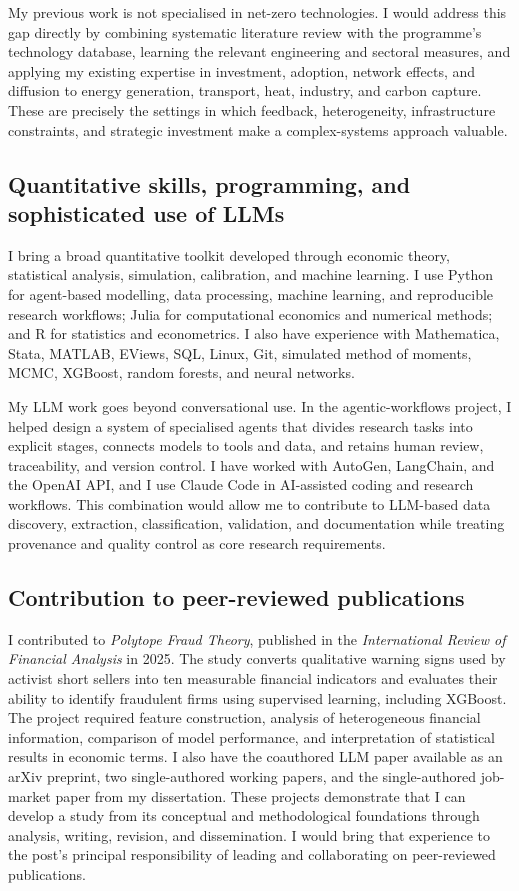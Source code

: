 \documentclass{nfr}
\begin{document}
My previous work is not specialised in net-zero technologies. I would address this gap directly by combining systematic literature review with the programme's technology database, learning the relevant engineering and sectoral measures, and applying my existing expertise in investment, adoption, network effects, and diffusion to energy generation, transport, heat, industry, and carbon capture. These are precisely the settings in which feedback, heterogeneity, infrastructure constraints, and strategic investment make a complex-systems approach valuable.

\subsection*{Quantitative skills, programming, and sophisticated use of LLMs}

I bring a broad quantitative toolkit developed through economic theory, statistical analysis, simulation, calibration, and machine learning. I use Python for agent-based modelling, data processing, machine learning, and reproducible research workflows; Julia for computational economics and numerical methods; and R for statistics and econometrics. I also have experience with Mathematica, Stata, MATLAB, EViews, SQL, Linux, Git, simulated method of moments, MCMC, XGBoost, random forests, and neural networks.

My LLM work goes beyond conversational use. In the agentic-workflows project, I helped design a system of specialised agents that divides research tasks into explicit stages, connects models to tools and data, and retains human review, traceability, and version control. I have worked with AutoGen, LangChain, and the OpenAI API, and I use Claude Code in AI-assisted coding and research workflows. This combination would allow me to contribute to LLM-based data discovery, extraction, classification, validation, and documentation while treating provenance and quality control as core research requirements.

\subsection*{Contribution to peer-reviewed publications}

I contributed to \textit{Polytope Fraud Theory}, published in the \textit{International Review of Financial Analysis} in 2025. The study converts qualitative warning signs used by activist short sellers into ten measurable financial indicators and evaluates their ability to identify fraudulent firms using supervised learning, including XGBoost. The project required feature construction, analysis of heterogeneous financial information, comparison of model performance, and interpretation of statistical results in economic terms. I also have the coauthored LLM paper available as an arXiv preprint, two single-authored working papers, and the single-authored job-market paper from my dissertation. These projects demonstrate that I can develop a study from its conceptual and methodological foundations through analysis, writing, revision, and dissemination. I would bring that experience to the post's principal responsibility of leading and collaborating on peer-reviewed publications.
\end{document}
